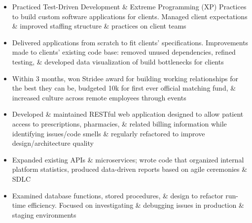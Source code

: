 \documentclass[10pt,a4paper,ragged2e]{altacv}
\begin{document}
\tagline{}


\begin{fullwidth}
\makecvheader
\end{fullwidth}



\begin{itemize}
\item {Practiced Test-Driven Development \& Extreme Programming (XP) Practices to build custom software applications for clients. Managed client expectations \& improved staffing structure \& practices on client teams}

\item{Delivered applications from scratch to fit clients' specifications. Improvements made to clients' existing code base: removed unused dependencies, refined testing, \& developed data visualization of build bottlenecks for clients}

\item{Within 3 months, won Stridee award for building working relationships for the best they can be, budgeted 10k for first ever official matching fund, \& increased culture across remote employees through events}
\end{itemize}

\divider \newline
{}
\begin{itemize}
\item {Developed \& maintained RESTful web application designed to allow patient access to prescriptions, pharmacies, \& related billing information while identifying issues/code smells \& regularly refactored to improve design/architecture quality}

\item{Expanded existing APIs \& microservices; wrote code that organized internal platform statistics, produced data-driven reports based on agile ceremonies \& SDLC}

\item{Examined database functions, stored procedures, \& design to refactor run-time efficiency. Focused on investigating \& debugging issues in production \& staging environments}
\end{itemize}
\end{document}
